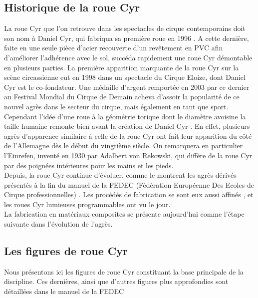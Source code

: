 \subsection{Historique de la roue Cyr}
La roue Cyr que l'on retrouve dans les spectacles de cirque contemporains doit son  nom à Daniel Cyr, qui fabriqua sa première roue en 1996 \cite{Inertie}. A cette dernière, faite en une seule pièce d'acier recouverte d'un revêtement en PVC afin d'améliorer l'adhérence avec le sol, succéda rapidement  une roue Cyr démontable en plusieurs parties. La première apparition marquante de la roue Cyr sur la scène circassienne eut en 1998 dans un spectacle du Cirque Eloize, dont Daniel Cyr est le co-fondateur. Une médaille d'argent remportée en 2003 par ce dernier au Festival Mondial du Cirque de Demain acheva d'assoir la popularité de ce nouvel agrès dans le secteur du cirque, mais également en tant que sport.\\
Cependant l'idée d'une roue à la géométrie torique dont le diamètre avoisine la taille humaine remonte bien avant la création de Daniel Cyr \cite{Inertiehist,gymmedia,howstuffwork}. En effet, plusieurs agrès d'apparence similaire à celle de la roue Cyr ont fait leur apparition du côté de l'Allemagne dès le début du vingtième siècle. On remarquera en particulier l'Einrefen, inventé en 1930 par Adalbert von Rekowski, qui diffère de la roue Cyr par des poignées intérieures pour les mains et les pieds. \\
Depuis, la roue Cyr continue d'évoluer, comme le montrent les agrès dérivés présentés à la fin du manuel de la FEDEC (Fédération Européenne Des Ecoles de Cirque professionnelles) \cite{Fedec2011}. Les procédés de fabrication se sont eux aussi affinés \cite{corbin}, et les roues Cyr lumieuses programmables ont vu le jour.\\
La fabrication en matériaux composites se présente aujourd'hui comme l'étape suivante dans l'évolution de l'agrès.

\subsection{Les figures de roue Cyr}
Nous présentons ici les figures de roue Cyr constituant la base principale de la discipline. Ces dernières, ainsi que d'autres figures plus approfondies sont détaillées dans le manuel de la FEDEC \cite{Fedec2011}
